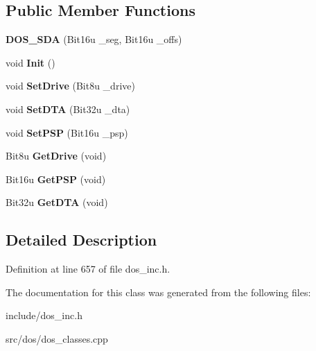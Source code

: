 \subsection*{Public Member Functions}
\begin{DoxyCompactItemize}
\item 
\hypertarget{classDOS__SDA_a6d3cdb7092bcf54e478ccf3f47ba5d5f}{{\bfseries D\-O\-S\-\_\-\-S\-D\-A} (Bit16u \-\_\-seg, Bit16u \-\_\-offs)}\label{classDOS__SDA_a6d3cdb7092bcf54e478ccf3f47ba5d5f}

\item 
\hypertarget{classDOS__SDA_ac7714f909bc845b995adc9d83a336dc7}{void {\bfseries Init} ()}\label{classDOS__SDA_ac7714f909bc845b995adc9d83a336dc7}

\item 
\hypertarget{classDOS__SDA_a26e7bcf4f9d9624cb400868ba2c92042}{void {\bfseries Set\-Drive} (Bit8u \-\_\-drive)}\label{classDOS__SDA_a26e7bcf4f9d9624cb400868ba2c92042}

\item 
\hypertarget{classDOS__SDA_a97cc9bf22c2fd0b3dfcdf9e7ed941b90}{void {\bfseries Set\-D\-T\-A} (Bit32u \-\_\-dta)}\label{classDOS__SDA_a97cc9bf22c2fd0b3dfcdf9e7ed941b90}

\item 
\hypertarget{classDOS__SDA_a01a00b99627b18c1b53112911554fb40}{void {\bfseries Set\-P\-S\-P} (Bit16u \-\_\-psp)}\label{classDOS__SDA_a01a00b99627b18c1b53112911554fb40}

\item 
\hypertarget{classDOS__SDA_a6191cfbb11aa6071c6900e3a42d3d4e8}{Bit8u {\bfseries Get\-Drive} (void)}\label{classDOS__SDA_a6191cfbb11aa6071c6900e3a42d3d4e8}

\item 
\hypertarget{classDOS__SDA_a7a777fd33ac1dcf09aeaa1e94e53eec5}{Bit16u {\bfseries Get\-P\-S\-P} (void)}\label{classDOS__SDA_a7a777fd33ac1dcf09aeaa1e94e53eec5}

\item 
\hypertarget{classDOS__SDA_a4a0b598523ac18da40e069ff37f43fe4}{Bit32u {\bfseries Get\-D\-T\-A} (void)}\label{classDOS__SDA_a4a0b598523ac18da40e069ff37f43fe4}

\end{DoxyCompactItemize}


\subsection{Detailed Description}


Definition at line 657 of file dos\-\_\-inc.\-h.



The documentation for this class was generated from the following files\-:\begin{DoxyCompactItemize}
\item 
include/dos\-\_\-inc.\-h\item 
src/dos/dos\-\_\-classes.\-cpp\end{DoxyCompactItemize}
